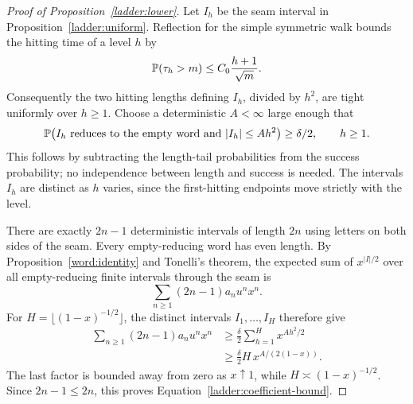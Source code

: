 \begin{proof}[Proof of Proposition~\ref{ladder:lower}]
Let $I_h$ be the seam interval in Proposition~\ref{ladder:uniform}.
Reflection for the simple symmetric walk bounds the hitting time of a
level $h$ by
\[
 \P(\tau_h>m)\le C_0\frac{h+1}{\sqrt m}.
\]
Consequently the two hitting lengths defining $I_h$, divided by $h^2$,
are tight uniformly over $h\ge1$.
Choose a deterministic $A<\infty$ large enough that
\[
 \P\bigl(I_h\text{ reduces to the empty word and }|I_h|\le Ah^2\bigr)
 \ge\delta/2,\qquad h\ge1.
\]
This follows by subtracting the length-tail probabilities from the success
probability; no independence between length and success is needed.
The intervals $I_h$ are distinct as $h$ varies, since the first-hitting
endpoints move strictly with the level.

There are exactly $2n-1$ deterministic intervals of length $2n$ using
letters on both sides of the seam.
Every empty-reducing word has even length.
By Proposition~\ref{word:identity} and Tonelli's theorem, the expected sum
of $x^{|I|/2}$ over all empty-reducing finite intervals through the seam is
\[
 \sum_{n\ge1}(2n-1)a_nu^n x^n.
\]
For $H=\lfloor(1-x)^{-1/2}\rfloor$, the distinct intervals
$I_1,\ldots,I_H$ therefore give
\begin{align*}
 \sum_{n\ge1}(2n-1)a_nu^n x^n
 &\ge \frac\delta2\sum_{h=1}^H x^{Ah^2/2}\\
 &\ge \frac\delta2 H\,x^{A/(2(1-x))}.
\end{align*}
The last factor is bounded away from zero as $x\uparrow1$, while
$H\asymp(1-x)^{-1/2}$.
Since $2n-1\le2n$, this proves
Equation~\eqref{ladder:coefficient-bound}.
\end{proof}
